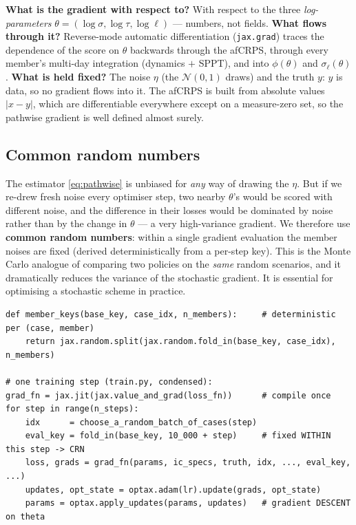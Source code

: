 \documentclass[11pt]{article}
\newcommand{\code}[1]{\texttt{#1}}
\begin{document}
\begin{keybox}
\textbf{What is the gradient with respect to?} With respect to the three
\emph{log-parameters} $\theta=(\log\sigma,\log\tau,\log\ell)$ --- numbers, not
fields. \textbf{What flows through it?} Reverse-mode automatic differentiation
(\code{jax.grad}) traces the dependence of the score on $\theta$ backwards
through the afCRPS, through every member's multi-day integration (dynamics $+$
SPPT), and into $\phi(\theta)$ and $\sigma_\ell(\theta)$. \textbf{What is held
fixed?} The noise $\eta$ (the $\mathcal N(0,1)$ draws) and the truth $y$: $y$ is
data, so no gradient flows into it. The afCRPS is built from absolute values
$|x-y|$, which are differentiable everywhere except on a measure-zero set, so the
pathwise gradient is well defined almost surely.
\end{keybox}

\subsection{Common random numbers}\label{sec:crn}

The estimator \eqref{eq:pathwise} is unbiased for \emph{any} way of drawing the
$\eta$. But if we re-drew fresh noise every optimiser step, two nearby $\theta$'s
would be scored with different noise, and the difference in their losses would be
dominated by noise rather than by the change in $\theta$ --- a very high-variance
gradient. We therefore use \textbf{common random numbers}: within a single
gradient evaluation the member noises are fixed (derived deterministically from a
per-step key). This is the Monte Carlo analogue of comparing two policies on the
\emph{same} random scenarios, and it dramatically reduces the variance of the
stochastic gradient. It is essential for optimising a stochastic scheme in
practice.

\begin{lstlisting}
def member_keys(base_key, case_idx, n_members):     # deterministic per (case, member)
    return jax.random.split(jax.random.fold_in(base_key, case_idx), n_members)

# one training step (train.py, condensed):
grad_fn = jax.jit(jax.value_and_grad(loss_fn))      # compile once
for step in range(n_steps):
    idx      = choose_a_random_batch_of_cases(step)
    eval_key = fold_in(base_key, 10_000 + step)     # fixed WITHIN this step -> CRN
    loss, grads = grad_fn(params, ic_specs, truth, idx, ..., eval_key, ...)
    updates, opt_state = optax.adam(lr).update(grads, opt_state)
    params = optax.apply_updates(params, updates)   # gradient DESCENT on theta
\end{lstlisting}
\end{document}

